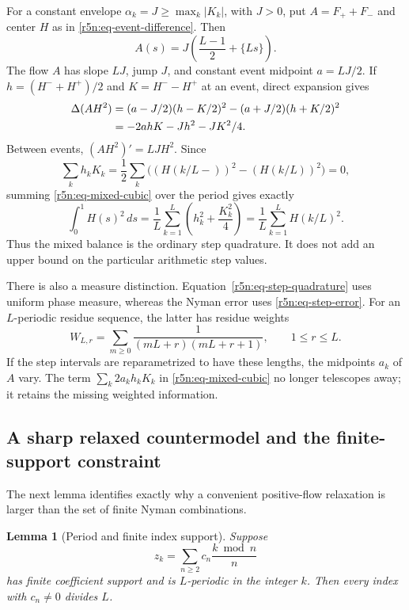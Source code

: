 \documentclass[11pt,a4paper]{article}
\newtheorem{lemma}[theorem]{Lemma}
\theoremstyle{definition}\newtheorem{definition}[theorem]{Definition}
\theoremstyle{remark}\newtheorem{remark}[theorem]{Remark}
\numberwithin{equation}{section}
\begin{document}
For a constant envelope \(\alpha_k=J\ge\max_k|K_k|\), with
\(J>0\), put \(A=F_++F_-\) and center \(H\) as in
\eqref{r5n:eq-event-difference}. Then
\[
 A(s)=J\left(\frac{L-1}{2}+\{Ls\}\right).
\]
The flow \(A\) has slope \(LJ\), jump \(J\), and constant event
midpoint \(a=LJ/2\). If
\(h=(H^-+H^+)/2\) and \(K=H^--H^+\) at an event, direct
expansion gives
\begin{align}
\label{r5n:eq-mixed-cubic}
 \Delta(AH^2)
 &=(a-J/2)(h-K/2)^2-(a+J/2)(h+K/2)^2\notag\\
 &=-2ahK-Jh^2-JK^2/4.
\end{align}
Between events, \((AH^2)'=LJH^2\). Since
\[
 \sum_k h_kK_k
 =\frac12\sum_k\bigl((H(k/L-))^2-(H(k/L))^2\bigr)=0,
\]
summing \eqref{r5n:eq-mixed-cubic} over the period gives exactly
\begin{equation}
\label{r5n:eq-step-quadrature}
 \int_0^1H(s)^2\,ds
 =\frac1L\sum_{k=1}^L
       \left(h_k^2+\frac{K_k^2}{4}\right)
 =\frac1L\sum_{k=1}^LH(k/L)^2.
\end{equation}
Thus the mixed balance is the ordinary step quadrature.
It does not add an upper bound on the particular arithmetic
step values.

There is also a measure distinction.
Equation~\eqref{r5n:eq-step-quadrature} uses uniform phase measure,
whereas the Nyman error uses \eqref{r5n:eq-step-error}.
For an \(L\)-periodic residue sequence, the latter has residue
weights
\[
 W_{L,r}=\sum_{m\ge0}
       \frac1{(mL+r)(mL+r+1)},\qquad 1\le r\le L.
\]
If the step intervals are reparametrized to have these lengths,
the midpoints \(a_k\) of \(A\) vary. The term
\(\sum_k2a_kh_kK_k\) in \eqref{r5n:eq-mixed-cubic} no longer
telescopes away; it retains the missing weighted information.

\subsection{A sharp relaxed countermodel and the finite-support constraint}
\label{r5n:subsec-relaxation}

The next lemma identifies exactly why a convenient positive-flow
relaxation is larger than the set of finite Nyman combinations.

\begin{lemma}[Period and finite index support]
\label{r5n:lem-period-support}
Suppose
\[
 z_k=\sum_{n\ge2}c_n\frac{k\bmod n}{n}
\]
has finite coefficient support and is \(L\)-periodic in the
integer \(k\). Then every index with \(c_n\ne0\) divides \(L\).
\end{lemma}
\end{document}
